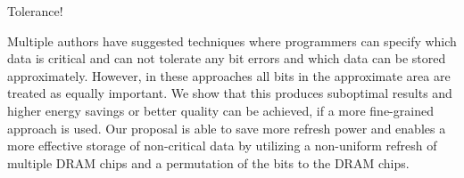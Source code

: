 Tolerance!

Multiple authors have suggested techniques where programmers can specify which data is critical and can not tolerate any bit errors and which data can be stored approximately. However, in these approaches all bits in the approximate area are treated as equally important. We show that this produces suboptimal results and higher energy savings or better quality can be achieved, if a more fine-grained approach is used. Our proposal is able to save more refresh power and enables a more effective storage of non-critical data by utilizing a non-uniform refresh of multiple DRAM chips and a permutation of the bits to the DRAM chips. 